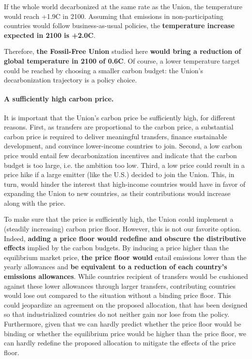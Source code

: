 \documentclass[12pt,english]{article}
\begin{document}
If the whole world decarbonized at the same rate as the Union, the temperature would reach +1.9\textdegree{}C in 2100. Assuming that emissions in non-participating countries would follow business-as-usual policies, %
the \textbf{temperature increase expected in 2100 is +2.0\textdegree{}C}. 

Therefore, \textbf{the Fossil-Free Union} studied here \textbf{would bring a reduction of global temperature in 2100 of 0.6\textdegree{}C}. Of course, a lower temperature target could be reached by choosing a smaller carbon budget: the Union's decarbonization trajectory is a policy choice. %

\paragraph{A sufficiently high carbon price.}
It is important that the Union's carbon price be sufficiently high, for different reasons. First, as transfers are proportional to the carbon price, a substantial carbon price is required to deliver meaningful transfers, finance sustainable development, and convince lower-income countries to join. Second, a low carbon price would entail few decarbonization incentives and indicate that the carbon budget is too large, i.e. the ambition too low. Third, a low price could result in a price hike if a large emitter (like the U.S.) decided to join the Union. This, in turn, would hinder the interest that high-income countries would have in favor of expanding the Union to new countries, as their contributions would increase along with the price.

To make sure that the price is sufficiently high, the Union could implement a (steadily increasing) carbon price floor. However, this is not our favorite option. Indeed, \textbf{adding a price floor would redefine and obscure the distributive effects} implied by the carbon budgets. By inducing a price higher than the equilibrium market price, \textbf{the price floor would} entail emissions lower than the yearly allowances and \textbf{be equivalent to a reduction of each country's emissions allowances}. While countries recipient of transfers would be cushioned against these lower allowances through larger transfers, contributing countries would lose out compared to the situation without a binding price floor. This could jeopardize an agreement on the proposed allocation, that has been designed so that industrialized countries do not %
neither gain nor 
lose from the policy. 
Furthermore, given that we can hardly predict whether the price floor would be binding or whether the equilibrium price would be higher than the price floor, we can hardly redefine the proposed allocation to mitigate the effects of the price floor.
\end{document}
